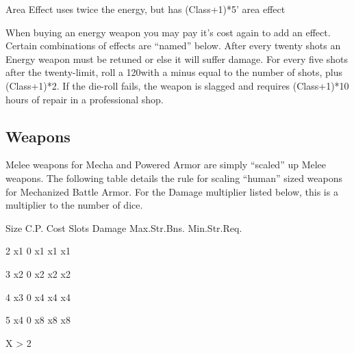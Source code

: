 \documentclass[twoside]{book}
\begin{document}
              
                 Area Effect   
                  uses twice the energy, but has (Class+1)*5'
                 area effect 
                
              When buying an energy weapon you may pay it’s
               cost again to add an effect. Certain combinations of
               effects are “named” below.   After every twenty shots an Energy weapon must be
               retuned or else it will suffer damage. For every five
               shots after the twenty-limit, roll a 120with a minus
               equal to the number of shots, plus (Class+1)*2. If the
               die-roll fails, the weapon is slagged and requires
               (Class+1)*10 hours of repair in a professional shop.
               
\subsection{Weapons}
      Melee weapons for Mecha and Powered Armor are
               simply “scaled” up Melee weapons. The
               following table details the rule for scaling
               “human” sized weapons for Mechanized Battle
               Armor. For the Damage multiplier listed below, this is a
               multiplier to the number of dice.   
                
                  
                   Size 
                   C.P. Cost 
                   Slots 
                   Damage 
                   Max.Str.Bns. 
                   Min.Str.Req.   
                  
                  
                   2   
                   x1   
                   0   
                   x1   
                   x1   
                   x1   
                  
                  
                   3   
                   x2   
                   0   
                   x2   
                   x2   
                   x2   
                  
                  
                   4   
                   x3   
                   0   
                   x4   
                   x4   
                   x4   
                  
                  
                   5   
                   x4   
                   0   
                   x8   
                   x8   
                   x8   
                  
                  
                         X    >  
                      2   
                    
\end{document}
